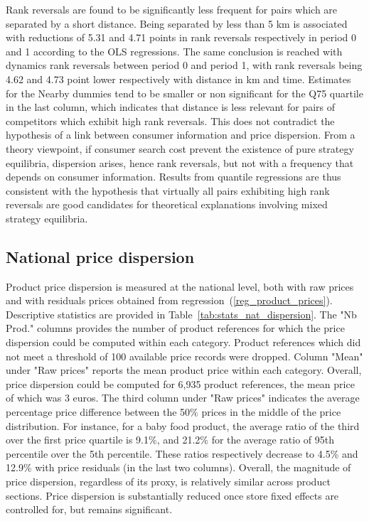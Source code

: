 \documentclass[english]{article}
\begin{document}
Rank reversals are found to be significantly less frequent for pairs which are separated by a short distance. Being separated by less than 5 km is associated with reductions of 5.31 and 4.71 points in rank reversals respectively in period 0 and 1 according to the OLS regressions. The same conclusion is reached with dynamics rank reversals between period 0 and period 1, with rank reversals being 4.62 and 4.73 point lower respectively with distance in km and time. Estimates for the Nearby dummies tend to be smaller or non significant for the Q75 quartile in the last column, which indicates that distance is less relevant for pairs of competitors which exhibit high rank reversals. This does not contradict the hypothesis of a link between consumer information and price dispersion. From a theory viewpoint, if consumer search cost prevent the existence of pure strategy equilibria, dispersion arises, hence rank reversals, but not with a frequency that depends on consumer information. Results from quantile regressions are thus consistent with the hypothesis that virtually all pairs exhibiting high rank reversals are good candidates for theoretical explanations involving mixed strategy equilibria.

\subsection{National price dispersion}

Product price dispersion is measured at the national level, both with raw prices and with residuals prices obtained from regression~(\ref{reg_product_prices}). Descriptive statistics are provided in Table~\ref{tab:stats_nat_dispersion}. The "Nb Prod." columns provides the number of product references for which the price dispersion could be computed within each category. Product references which did not meet a threshold of 100 available price records were dropped. Column "Mean" under "Raw prices" reports the mean product price within each category. Overall, price dispersion could be computed for 6,935 product references, the mean price of which was 3 euros. The third column under "Raw prices" indicates the average percentage price difference between the 50\% prices in the middle of the price distribution. For instance, for a baby food product, the average ratio of the third over the first price quartile is 9.1\%, and 21.2\% for the average ratio of 95th percentile over the 5th percentile. These ratios respectively decrease to 4.5\% and 12.9\% with price residuals (in the last two columns). Overall, the magnitude of price dispersion, regardless of its proxy, is relatively similar across product sections. Price dispersion is substantially reduced once store fixed effects are controlled for, but remains significant.
\end{document}
